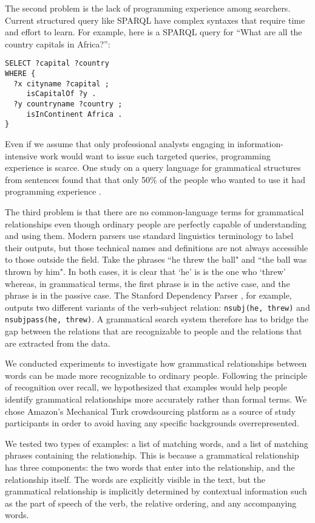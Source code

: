 \documentclass{sigchi}
\newcommand{\code}[1] {\texttt{#1}}
\begin{document}
The second problem is the lack of programming experience among searchers. Current structured query like SPARQL have complex syntaxes that require time and effort to learn. For example, here is a SPARQL query for ``What are all the country capitals in Africa?'':
\begin{verbatim}
SELECT ?capital ?country
WHERE {
  ?x cityname ?capital ;
     isCapitalOf ?y .
  ?y countryname ?country ;
     isInContinent Africa .
}
\end{verbatim}
Even if we assume that only professional analysts engaging in information-intensive work would want to issue such targeted queries,  programming experience is scarce. One study on a query language for  grammatical structures from sentences found that that only 50\% of the people who wanted to use it had programming experience \cite{}.

The third problem is that there are no common-language terms for grammatical relationships even though ordinary people are perfectly capable of understanding and using them. Modern parsers use standard linguistics terminology to label their outputs, but those technical names and definitions are not always accessible to those outside the field. Take the phrases ``he threw the ball" and ``the ball was thrown by him". In both cases, it is clear that `he' is is the one who `threw' whereas, in grammatical terms, the first phrase is in the active case, and the phrase is in the passive case. The Stanford Dependency Parser \cite{}, for example, outputs two different variants of the verb-subject relation: \code{nsubj(he, threw)} and \code{nsubjpass(he, threw)}. A grammatical search system therefore has to bridge the gap between the relations that are recognizable to people and the relations that are extracted from the data.


We conducted experiments to investigate how grammatical relationships between words can be made more recognizable to ordinary people. Following the principle of recognition over recall, we hypothesized that examples would help people identify grammatical relationships more accurately rather than formal terms. We chose Amazon's Mechanical Turk crowdsourcing platform as a source of study participants in order to avoid having any specific backgrounds overrepresented.

We tested two types of examples: a list of matching words, and a list of matching phrases containing the relationship. This is because a grammatical relationship has three components: the two words that enter into the relationship, and the relationship itself. The words are explicitly visible in the text, but the grammatical relationship is implicitly determined by contextual information such as the part of speech of the verb, the relative ordering, and any accompanying words.
\end{document}
